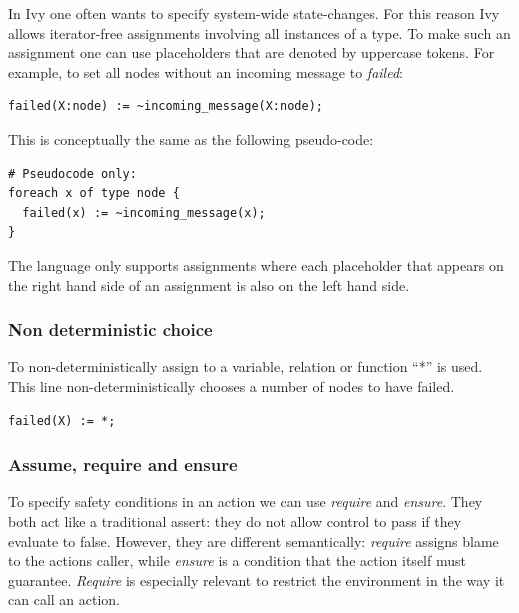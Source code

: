 \documentclass[fleqn]{article}
\begin{document}
In Ivy one often wants to specify system-wide state-changes. For this reason Ivy allows iterator-free assignments involving all instances of a type. To make such an assignment one can use placeholders that are denoted by uppercase tokens. For example, to set all nodes without an incoming message to \textit{failed}:

\begin{mdframed}[nobreak=true, backgroundcolor=light-gray, roundcorner=10pt,leftmargin=1, rightmargin=1, innerleftmargin=15, innertopmargin=15,innerbottommargin=15, outerlinewidth=1, linecolor=light-gray]
\begin{lstlisting}
failed(X:node) := ~incoming_message(X:node);
\end{lstlisting}
\end{mdframed}

\noindent This is conceptually the same as the following pseudo-code:

\begin{mdframed}[nobreak=true, backgroundcolor=light-gray, roundcorner=10pt,leftmargin=1, rightmargin=1, innerleftmargin=15, innertopmargin=15,innerbottommargin=15, outerlinewidth=1, linecolor=light-gray]
\begin{lstlisting}
# Pseudocode only:
foreach x of type node {
  failed(x) := ~incoming_message(x);
}
\end{lstlisting}
\end{mdframed}

The language only supports assignments where each placeholder that appears on the right hand side of an assignment is also on the left hand side.


\subsubsection{Non deterministic choice}
To non-deterministically assign to a variable, relation or function ``*'' is used.
This line non-deterministically chooses a number of nodes to have failed.

\begin{mdframed}[nobreak=true, backgroundcolor=light-gray, roundcorner=10pt,leftmargin=1, rightmargin=1, innerleftmargin=15, innertopmargin=15,innerbottommargin=15, outerlinewidth=1, linecolor=light-gray]
\begin{lstlisting}
failed(X) := *;
\end{lstlisting}
\end{mdframed}

\subsubsection{Assume, require and ensure}
To specify safety conditions in an action we can use \textit{require} and \textit{ensure}.
They both act like a traditional assert: they do not allow control to pass if they evaluate to false.
However, they are different semantically: \textit{require} assigns blame to the actions caller, while \textit{ensure}
is a condition that the action itself must guarantee. \textit{Require} is especially relevant to restrict
the environment in the way it can call an action.
\end{document}
